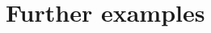 \documentclass[12pt]{article}
\newcommand{\incDemo}[2]{\label{demo:#2}\newpage}
\begin{document}
%
\section{Further examples}
\end{document}
